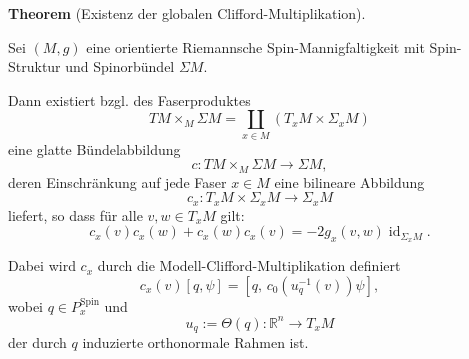 \documentclass[10pt, letterpaper]{article}
\newcommand{\id}{\operatorname{id}}
\newcommand{\R}{\mathbb{R}}
\newcommand{\Spin}{\mathrm{Spin}}
\newcommand{\CustomHeading}[3]{%
  \par\medskip\noindent%
  \textbf{#1 #2} \textnormal{(#3)}.\enskip%
}
\newenvironment{THEO}[2]{\CustomHeading{Theorem}{#1}{#2}}{}
\begin{document}
\begin{THEO}{}{Existenz der globalen Clifford-Multiplikation}
Sei $(M,g)$ eine orientierte Riemannsche Spin-Mannigfaltigkeit mit Spin-Struktur und Spinorbündel $\Sigma M$. 

Dann existiert bzgl. des Faserproduktes 
$$TM\times_M \Sigma M= \coprod_{x \in M}\left(T_x M \times \Sigma_x M\right)$$
eine glatte Bündelabbildung
\[
c:TM\times_M \Sigma M\longrightarrow \Sigma M,
\]
deren Einschränkung auf jede Faser $x\in M$ eine bilineare Abbildung
\[
c_x:T_xM\times \Sigma_xM\longrightarrow \Sigma_xM
\]
liefert, so dass für alle $v,w\in T_xM$ gilt:
\[
c_x(v)c_x(w)+c_x(w)c_x(v)
=
-2g_x(v,w)\id_{\Sigma_xM}.
\]

Dabei wird $c_x$ durch die Modell-Clifford-Multiplikation definiert
\[
c_x(v)[q,\psi]
=
[q,\,c_0(u_q^{-1}(v))\psi],
\]
wobei $q\in P_x^{\Spin}$ und
\[
u_q:=\Theta(q):\R^n\to T_xM
\]
der durch $q$ induzierte orthonormale Rahmen ist.
\end{THEO}
\end{document}
